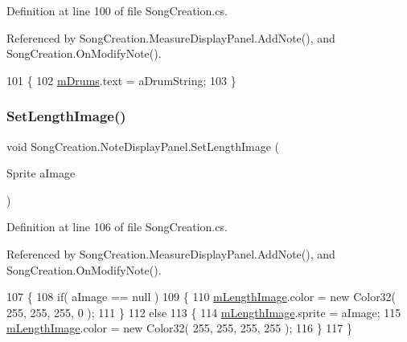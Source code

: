 Definition at line 100 of file Song\+Creation.\+cs.



Referenced by Song\+Creation.\+Measure\+Display\+Panel.\+Add\+Note(), and Song\+Creation.\+On\+Modify\+Note().


\begin{DoxyCode}
101         \{
102             \hyperlink{class_song_creation_1_1_note_display_panel_a7a6d14026ca347c32b2842d5c9dc54e9}{mDrums}.text = aDrumString;
103         \}
\end{DoxyCode}
\mbox{\label{class_song_creation_1_1_note_display_panel_a51376b7beedfd9afdc8574b1ca9f47fa}} 
\subsubsection{\texorpdfstring{Set\+Length\+Image()}{SetLengthImage()}}
{\footnotesize\ttfamily void Song\+Creation.\+Note\+Display\+Panel.\+Set\+Length\+Image (\begin{DoxyParamCaption}\item[{Sprite}]{a\+Image }\end{DoxyParamCaption})}



Definition at line 106 of file Song\+Creation.\+cs.



Referenced by Song\+Creation.\+Measure\+Display\+Panel.\+Add\+Note(), and Song\+Creation.\+On\+Modify\+Note().


\begin{DoxyCode}
107         \{
108             \textcolor{keywordflow}{if}( aImage == null )
109             \{
110                 \hyperlink{class_song_creation_1_1_note_display_panel_a88560efe222dafc26795c508bcf5b5a2}{mLengthImage}.color = \textcolor{keyword}{new} Color32( 255, 255, 255, 0 );
111             \}
112             \textcolor{keywordflow}{else}
113             \{
114                 \hyperlink{class_song_creation_1_1_note_display_panel_a88560efe222dafc26795c508bcf5b5a2}{mLengthImage}.sprite = aImage;
115                 \hyperlink{class_song_creation_1_1_note_display_panel_a88560efe222dafc26795c508bcf5b5a2}{mLengthImage}.color = \textcolor{keyword}{new} Color32( 255, 255, 255, 255 );
116             \}
117         \}
\end{DoxyCode}
\mbox{\label{class_song_creation_1_1_note_display_panel_a7247d36ccbd7449be872432bf1ad7781}} 
